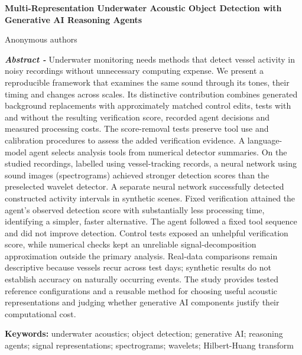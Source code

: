 \documentclass[11pt,letterpaper]{article}
\newcommand{\drafttitle}[1]{\begin{center}\sffamily\bfseries\fontsize{16}{19}\selectfont #1\end{center}}
\begin{document}
\fontsize{11}{13}\selectfont

\nocite{portia,signals1,signals2,uabench,physicsgen,huang1998,flowmatching,qwen,waveletship,uniqueship,speechocean,wav2vec2}

\drafttitle{Multi-Representation Underwater Acoustic Object Detection with Generative AI Reasoning Agents}

\begin{center}Anonymous authors\end{center}

{\fontsize{10}{11.5}\selectfont\noindent \textbf{\textit{Abstract - }}Underwater monitoring needs methods that detect vessel activity in noisy recordings without unnecessary computing expense. We present a reproducible framework that examines the same sound through its tones, their timing and changes across scales. Its distinctive contribution combines generated background replacements with approximately matched control edits, tests with and without the resulting verification score, recorded agent decisions and measured processing costs. The score-removal tests preserve tool use and calibration procedures to assess the added verification evidence. A language-model agent selects analysis tools from numerical detector summaries. On the studied recordings, labelled using vessel-tracking records, a neural network using sound images (spectrograms) achieved stronger detection scores than the preselected wavelet detector. A separate neural network successfully detected constructed activity intervals in synthetic scenes. Fixed verification attained the agent's observed detection score with substantially less processing time, identifying a simpler, faster alternative. The agent followed a fixed tool sequence and did not improve detection. Control tests exposed an unhelpful verification score, while numerical checks kept an unreliable signal-decomposition approximation outside the primary analysis. Real-data comparisons remain descriptive because vessels recur across test days; synthetic results do not establish accuracy on naturally occurring events. The study provides tested reference configurations and a reusable method for choosing useful acoustic representations and judging whether generative AI components justify their computational cost.\par}

{\fontsize{9}{11}\selectfont\noindent \textbf{Keywords:} underwater acoustics; object detection; generative AI; reasoning agents; signal representations; spectrograms; wavelets; Hilbert-Huang transform\par}
\end{document}
